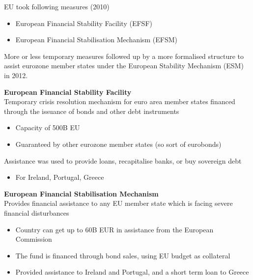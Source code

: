 \documentclass{beamer}
\begin{document}
\begin{frame}
  EU took following measures (2010)
  \begin{itemize}
    \item European Financial Stability Facility (EFSF) 
    \item European Financial Stabilisation Mechanism (EFSM) 
  \end{itemize}
  \medskip
  More or less temporary measures followed up by a more formalised structure to assist eurozone member states under the European Stability Mechanism (ESM) in 2012.
\end{frame}

\begin{frame}
  \textbf{European Financial Stability Facility}\\
  Temporary crisis resolution mechanism for euro area member states financed through the issuance of bonds and other debt instruments
  \begin{itemize}
    \item Capacity of 500B EU
    \item Guaranteed by other eurozone member states (so sort of eurobonds)
  \end{itemize}
    \medskip
   Assistance was used to provide loans, recapitalise banks, or buy sovereign debt    
   \begin{itemize}
     \item For Ireland, Portugal, Greece
   \end{itemize}
\end{frame}

\begin{frame}
  \textbf{European Financial Stabilisation Mechanism}\\
   Provides financial assistance to any EU member state which is facing severe financial disturbances
   \begin{itemize}
     \item Country can get up to 60B EUR in assistance from the European Commission 
     \item The fund is financed through  bond sales, using EU budget as collateral    
    \item Provided assistance to Ireland and Portugal, and a short term loan to Greece
   \end{itemize}
\end{frame}
\end{document}
